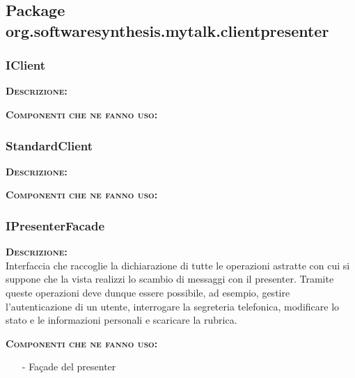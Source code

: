 \subsection{Package org.softwaresynthesis.mytalk.clientpresenter}
\subsubsection{IClient}
\begin{description}
	\item{\scshape\bfseries Descrizione:}\\
	\item{\scshape\bfseries Componenti che ne fanno uso:} 
\end{description}

\subsubsection{StandardClient}
\begin{description}
	\item{\scshape\bfseries Descrizione:}\\
	\item{\scshape\bfseries Componenti che ne fanno uso:} 
\end{description}

\subsubsection{IPresenterFacade}
\begin{description}
	\item{\scshape\bfseries Descrizione:}\\
Interfaccia che raccoglie la dichiarazione di tutte le operazioni astratte con cui si suppone che la vista realizzi lo scambio di messaggi con il presenter. Tramite queste operazioni deve dunque essere possibile, ad esempio, gestire l'autenticazione di un utente, interrogare la segreteria telefonica, modificare lo stato e le informazioni personali e scaricare la rubrica.
	\item{\scshape\bfseries Componenti che ne fanno uso:}
	\begin{itemize}[noitemsep,nolistsep]
	  \item[-] Façade del presenter
	\end{itemize}
\end{description}

